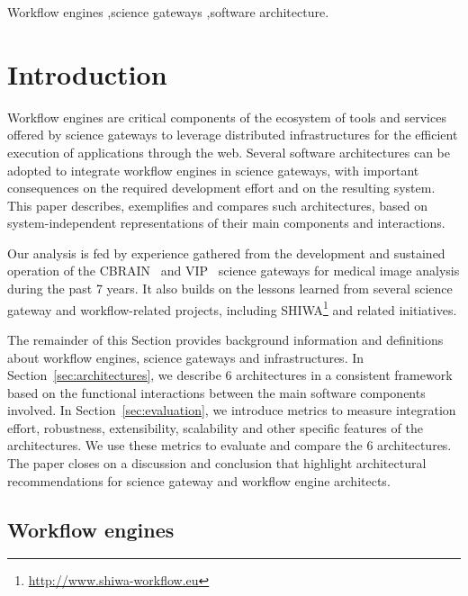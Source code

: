 \documentclass[preprint,3p,twocolumn]{elsarticle}
\begin{document}
\begin{frontmatter}
\begin{keyword}
Workflow engines \sep science gateways \sep software architecture.
\end{keyword}

\end{frontmatter}




\section{Introduction}

Workflow engines are critical components of the ecosystem of tools and
services offered by science gateways to leverage distributed
infrastructures for the efficient execution of applications through
the web. Several software architectures can be adopted to integrate
workflow engines in science gateways, with important consequences on
the required development effort and on the resulting system. This
paper describes, exemplifies and compares such architectures, based on
system-independent representations of their main components and
interactions.

Our analysis is fed by experience gathered from the development and
sustained operation of the CBRAIN~\cite{SHER-14} and
VIP~\cite{GLAT-13} science gateways for medical image analysis during
the past 7 years. It also builds on the lessons learned from several
science gateway and workflow-related projects, including
SHIWA\footnote{\url{http://www.shiwa-workflow.eu}} and related
initiatives.

The remainder of this Section provides background information and
definitions about workflow engines, science gateways and
infrastructures. In Section~\ref{sec:architectures}, we describe 6
architectures in a consistent framework based on the functional
interactions between the main software components involved. In
Section~\ref{sec:evaluation}, we introduce metrics to measure
integration effort, robustness, extensibility, scalability and other
specific features of the architectures. We use these metrics to
evaluate and compare the 6 architectures. The paper closes on a
discussion and conclusion that highlight architectural recommendations
for science gateway and workflow engine architects.

\subsection{Workflow engines}
\end{document}
